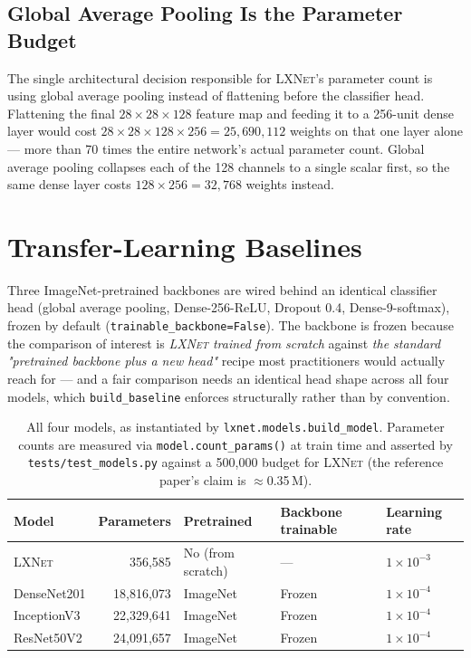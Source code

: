 \documentclass[11pt,a4paper,oneside]{report}
\newcommand{\LXNet}{\textsc{LXNet}}
\newcommand{\code}[1]{\texttt{\small #1}}
\begin{document}
\subsection{Global Average Pooling Is the Parameter Budget}

The single architectural decision responsible for \LXNet{}'s parameter count
is using global average pooling instead of flattening before the classifier
head. Flattening the final $28\times28\times128$ feature map and feeding it
to a 256-unit dense layer would cost
$28 \times 28 \times 128 \times 256 = 25{,}690{,}112$ weights on that one
layer alone --- more than 70 times the entire network's actual parameter
count. Global average pooling collapses each of the 128 channels to a single
scalar first, so the same dense layer costs $128 \times 256 = 32{,}768$
weights instead.

\section{Transfer-Learning Baselines}

Three ImageNet-pretrained backbones are wired behind an identical classifier
head (global average pooling, Dense-256-ReLU, Dropout 0.4, Dense-9-softmax),
frozen by default (\code{trainable\_backbone=False}). The backbone is frozen
because the comparison of interest is \emph{\LXNet{} trained from scratch}
against \emph{the standard "pretrained backbone plus a new head"} recipe most
practitioners would actually reach for --- and a fair comparison needs an
identical head shape across all four models, which \code{build\_baseline}
enforces structurally rather than by convention.

\begin{table}[h]
\centering
\small
\begin{tabular}{@{}lrlll@{}}
\toprule
\textbf{Model} & \textbf{Parameters} & \textbf{Pretrained} & \textbf{Backbone
trainable} & \textbf{Learning rate} \\
\midrule
\LXNet{} & 356{,}585 & No (from scratch) & --- & $1\times10^{-3}$ \\
DenseNet201 & 18{,}816{,}073 & ImageNet & Frozen & $1\times10^{-4}$ \\
InceptionV3 & 22{,}329{,}641 & ImageNet & Frozen & $1\times10^{-4}$ \\
ResNet50V2 & 24{,}091{,}657 & ImageNet & Frozen & $1\times10^{-4}$ \\
\bottomrule
\end{tabular}
\caption{All four models, as instantiated by \texttt{lxnet.models.build\_model}.
Parameter counts are measured via \texttt{model.count\_params()} at train
time and asserted by \texttt{tests/test\_models.py} against a 500{,}000
budget for \LXNet{} (the reference paper's claim is $\approx$0.35\,M).}
\label{tab:model-params}
\end{table}
\end{document}
